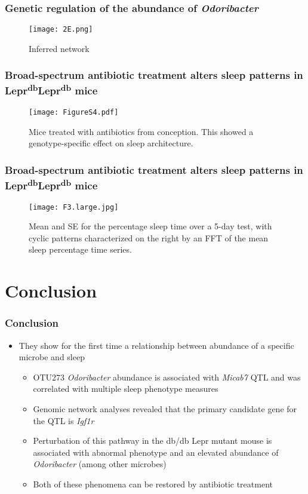 \documentclass{beamer}
\begin{document}
{\begin{frame}
\begin{center}
\end{center}



		\end{frame}
\begin{frame}
	\frametitle{Genetic regulation of the abundance of \textit{Odoribacter}}
	\begin{figure}
			\texttt{[image: 2E.png]}
			\caption{Inferred network}
	\end{figure}

\end{frame}

\begin{frame}[b]
\frametitle{Broad-spectrum antibiotic treatment alters sleep patterns in Lepr\textsuperscript{db}Lepr\textsuperscript{db} mice}

 \begin{figure}
 \centering
 \texttt{[image: FigureS4.pdf]}
 \caption{Mice treated with antibiotics from conception. 
 This showed a genotype-specific effect on sleep architecture.}
 \end{figure}
\end{frame}

\begin{frame}[b]
\frametitle{Broad-spectrum antibiotic treatment alters sleep patterns in Lepr\textsuperscript{db}Lepr\textsuperscript{db} mice}

 \begin{figure}
 \centering
 \texttt{[image: F3.large.jpg]}
 \caption{Mean and SE for the percentage sleep time over a 5-day test, with cyclic patterns characterized on the right by an FFT of the mean sleep percentage time series.}
 \end{figure}
\end{frame}



	\section{Conclusion}
		\begin{frame}
			\frametitle{Conclusion}
			\centering
			\begin{itemize}
			\item They show for the first time a relationship between abundance of a specific microbe and sleep
			\begin{itemize}
			\item OTU273 \textit{Odoribacter} abundance is associated with \textit{Micab7} QTL and was correlated with multiple sleep phenotype measures
			\item Genomic network analyses revealed that the primary candidate gene for the QTL is \textit{Igf1r}
			\item Perturbation of this pathway in the db/db Lepr mutant mouse is associated with abnormal phenotype and an elevated abundance of \textit{Odoribacter} (among other microbes)
			\item Both of these phenomena can be restored by antibiotic treatment 
			\end{itemize}
			\end{itemize}
		\end{frame}

}
\end{document}
